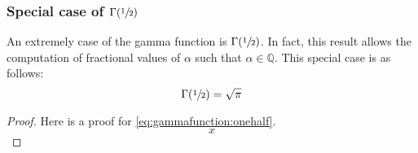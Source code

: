 \documentclass[12pt]{article}
\begin{document}
\pagebreak
\subsubsection{Special case of $\Gamma(\sfrac{1}{2})$ }
An extremely case of the gamma function is $\Gamma(\sfrac{1}{2})$. In fact, this result allows the computation of
fractional values of $\alpha$ such that $\alpha\in\mathbb{Q}$. This special case is as follows:
\begin{equation}\label{eq:gammafunction:onehalf}
	\Gamma(\sfrac{1}{2})=\sqrt{\pi}
\end{equation}
\begin{proof}
	Here is a proof for \autoref{eq:gammafunction:onehalf}.
	\begin{equation*}
		x
	\end{equation*}
\end{proof}


\pagebreak
\end{document}
